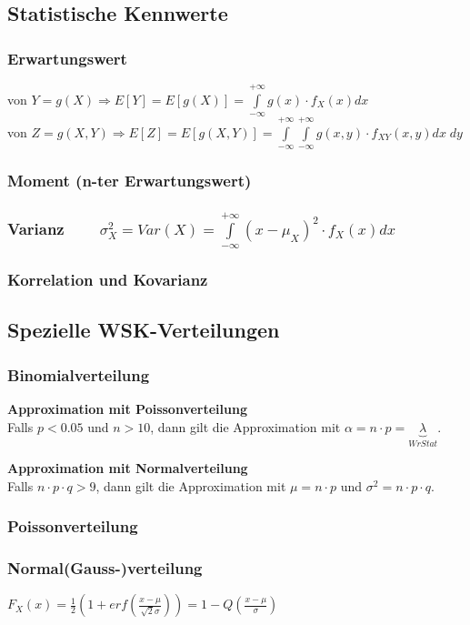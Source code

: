 \subsection{Statistische Kennwerte }
\subsubsection{Erwartungswert } 
	\vspace{-0.2cm} \hspace*{0.2cm}
	\parbox{16cm}{von $Y = g(X) \Rightarrow E[Y] = E[g(X)] = \int\limits_{-\infty}^{+\infty}g(x)\cdot f_X(x) d x$ \\ 
	von $Z = g(X,Y) \Rightarrow E[Z] = E[g(X,Y)] = \int\limits_{-\infty}^{+\infty}\int\limits_{-\infty}^{+\infty} g(x,y) \cdot f_{XY}(x,y) dx \; dy$}
	\vspace{-0.2cm}
\subsubsection{Moment (n-ter Erwartungswert) }
\subsubsection{Varianz  $\qquad \sigma_X^2 = Var(X) = \int\limits_{-\infty}^{+\infty}(x-\mu_X)^2\cdot f_X(x) dx$}
\subsubsection{Korrelation und Kovarianz }
\vspace{0.25cm}

\subsection{Spezielle WSK-Verteilungen }
\subsubsection{Binomialverteilung }\label{binominalverteilung}
\textbf{Approximation mit Poissonverteilung} \\
\hspace*{0.2cm} Falls $p < 0.05$ und $n > 10$, dann gilt die Approximation mit $\alpha = n \cdot p = \underbrace{\lambda}_{WrStat}$. \\
\vspace{-0.3cm}

\textbf{Approximation mit Normalverteilung} \\
\hspace*{0.2cm} Falls $n \cdot p \cdot q > 9$, dann gilt die Approximation mit $\mu = n \cdot p$ und
$\sigma^2 = n \cdot p \cdot q$.
\vspace{-0.2cm}

\subsubsection{Poissonverteilung }
\subsubsection{Normal(Gauss-)verteilung }
\hspace*{0.2cm} $F_X(x) = \frac{1}{2}(1+erf(\frac{x-\mu}{\sqrt{2}\sigma})) = 1-Q(\frac{x-\mu}{\sigma}) $